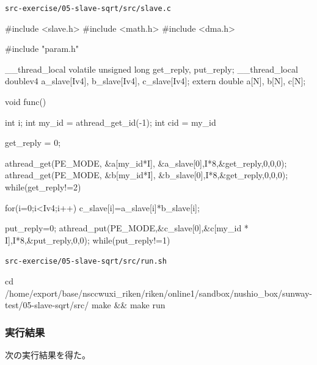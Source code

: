 \verb`src-exercise/05-slave-sqrt/src/slave.c`
\begin{code}
#include <slave.h>
#include <math.h>
#include <dma.h>

#include "param.h"

__thread_local volatile unsigned long get_reply, put_reply;
__thread_local doublev4 a_slave[Iv4], b_slave[Iv4], c_slave[Iv4];
extern double a[N], b[N], c[N];

void func() {
  int i;
  int my_id = athread_get_id(-1);
  int cid = my_id%

  get_reply = 0;

  athread_get(PE_MODE, &a[my_id*I], &a_slave[0],I*8,&get_reply,0,0,0);
  athread_get(PE_MODE, &b[my_id*I], &b_slave[0],I*8,&get_reply,0,0,0);
  while(get_reply!=2) {}

  for(i=0;i<Iv4;i++){
    c_slave[i]=a_slave[i]*b_slave[i];
  }

  put_reply=0;
  athread_put(PE_MODE,&c_slave[0],&c[my_id * I],I*8,&put_reply,0,0);
  while(put_reply!=1) {}

}

\end{code}

\verb`src-exercise/05-slave-sqrt/src/run.sh`
\begin{code}

cd /home/export/base/nsccwuxi_riken/riken/online1/sandbox/nushio_box/sunway-test/05-slave-sqrt/src/
make && make run
    
\end{code}

\subsubsection{実行結果}

次の実行結果を得た。

